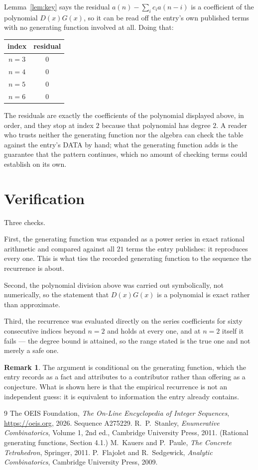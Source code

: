\documentclass[11pt,a4paper]{article}
\theoremstyle{plain}
\theoremstyle{definition}
\newtheorem{remark}[theorem]{Remark}
\begin{document}
Lemma~\ref{lem:key} says the residual $a(n)-\sum_ic_ia(n-i)$ is a coefficient of the
polynomial $D(x)G(x)$, so it can be read off the entry's own published terms with no
generating function involved at all. Doing that:
\begin{center}
\begin{tabular}{cc}
index & residual \\ \hline
$n=3$ & $0$ \\
$n=4$ & $0$ \\
$n=5$ & $0$ \\
$n=6$ & $0$
\end{tabular}
\end{center}
The residuals are exactly the coefficients of the polynomial displayed above, in order, and
they stop at index $2$ because that polynomial has degree $2$. A reader who trusts
neither the generating function nor the algebra can check the table against the entry's DATA
by hand; what the generating function adds is the guarantee that the pattern continues, which
no amount of checking terms could establish on its own.

\section{Verification}

Three checks.

First, the generating function was expanded as a power series in exact rational arithmetic and
compared against all $21$ terms the entry publishes: it reproduces every one. This is
what ties the recorded generating function to the sequence the recurrence is about.

Second, the polynomial division above was carried out symbolically, not numerically, so the
statement that $D(x)G(x)$ is a polynomial is exact rather than approximate.

Third, the recurrence was evaluated directly on the series coefficients for sixty consecutive
indices beyond $n=2$ and holds at every one, and at $n=2$ itself it fails --- the
degree bound is attained, so the range stated is the true one and not merely a safe one.

\begin{remark}
The argument is conditional on the generating function, which the entry records as a fact and
attributes to a contributor rather than offering as a conjecture. What is shown here is that
the empirical recurrence is not an independent guess: it is equivalent to information the
entry already contains.
\end{remark}

\begin{thebibliography}{9}
 The OEIS Foundation, \emph{The On-Line Encyclopedia of Integer
Sequences}, \url{https://oeis.org}, 2026. Sequence A275229.
 R.~P.~Stanley, \emph{Enumerative Combinatorics}, Volume 1, 2nd ed.,
Cambridge University Press, 2011. (Rational generating functions, Section 4.1.)
 M.~Kauers and P.~Paule, \emph{The Concrete Tetrahedron}, Springer, 2011.
 P.~Flajolet and R.~Sedgewick, \emph{Analytic Combinatorics}, Cambridge
University Press, 2009.
\end{thebibliography}
\end{document}
